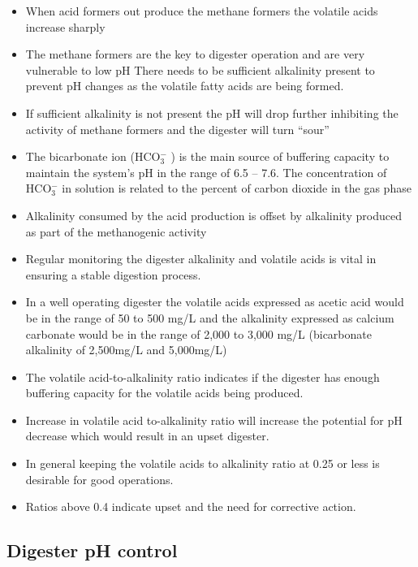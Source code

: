 \begin{itemize}
                        \item When acid formers out produce the methane formers the volatile acids increase sharply
                        \item The methane formers are the key to digester operation and are very vulnerable to low pH There needs to be sufficient alkalinity present to prevent pH changes as the volatile fatty acids are being formed.
                        \item If sufficient alkalinity is not present the pH will drop further inhibiting the activity of methane formers and the digester will turn “sour”
                        \item The bicarbonate ion (HCO$_3^-$ ) is the main source of buffering capacity to maintain the system’s pH in the range of 6.5 – 7.6. The concentration of HCO$_3^-$  in solution is related to the percent of carbon dioxide in the gas phase 
                        \item Alkalinity consumed by the acid production is offset by alkalinity produced as part of the methanogenic activity
                        \item Regular monitoring the digester alkalinity and volatile acids is vital in ensuring a stable digestion process.
                        \item In a well operating digester the volatile acids expressed as acetic acid would be in the range of 50 to 500 mg/L and the alkalinity expressed as calcium carbonate would be in the range of 2,000 to 3,000 mg/L (bicarbonate alkalinity of 2,500mg/L and 5,000mg/L)
                        \item The volatile acid-to-alkalinity ratio indicates if the digester has enough buffering capacity for the volatile acids being produced.
                         \item Increase in volatile acid to-alkalinity ratio will increase the potential for pH decrease which would result in an upset digester.
                         \item In general keeping the volatile acids to alkalinity ratio at 0.25 or less is desirable for good operations.
                        \item Ratios above 0.4 indicate upset and the need for corrective action.\\
                                            \end{itemize}
\subsection{Digester pH control}                        
    

